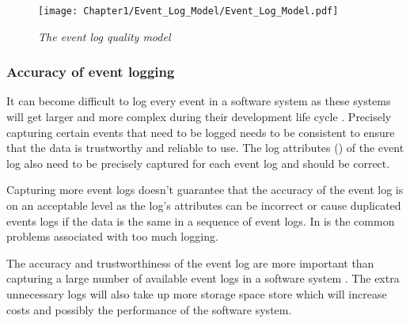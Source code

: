 \begin{figure}[!htb] %
	\centering %
	\texttt{[image: Chapter1/Event\_Log\_Model/Event\_Log\_Model.pdf]}
	\caption[The event log quality model]
	{\textit{The event log quality model \cite{Kherbouche2017}}} \label{fig:EventQModel}
\end{figure}

\subsubsection{Accuracy of event logging} 
It can become difficult to log every event in a software system as these systems will get larger and more complex during their development life cycle \cite{Stojanov2017}. Precisely capturing certain events that need to be logged needs to be consistent to ensure that the data is trustworthy and reliable to use. The log attributes () of the event log also need to be precisely captured for each event log and should be correct.\par Capturing more event logs doesn't guarantee that the accuracy of the event log is on an acceptable level as the log's attributes can be incorrect or cause duplicated events logs if the data is the same in a sequence of event logs. In  is the common problems associated with too much logging. \par The accuracy and trustworthiness of the event log are more important than capturing a large number of available event logs in a software system \cite{Zhu2015, Jans2012}. The extra unnecessary logs will also take up more storage space store which will increase costs and possibly the performance of the software system. 


